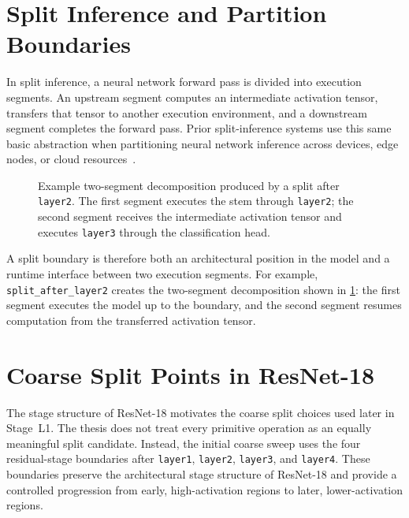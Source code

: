 \section{Split Inference and Partition Boundaries}
\label{sec:bg-split-inference}

In split inference, a neural network forward pass is divided into execution segments.
An upstream segment computes an intermediate activation tensor, transfers that tensor
to another execution environment, and a downstream segment completes the forward pass.
Prior split-inference systems use this same basic abstraction when partitioning neural
network inference across devices, edge nodes, or cloud resources~\cite{neurosurgeon,jointdnn}.

\begin{figure}[htbp]
\centering
%
\caption[Example two-segment decomposition (split after \texttt{layer2})]{Example two-segment decomposition produced by a split after \texttt{layer2}. The first segment executes the stem through \texttt{layer2}; the second segment receives the intermediate activation tensor and executes \texttt{layer3} through the classification head.}
\label{fig:split_after_layer2_two_segments}
\end{figure}

A split boundary is therefore both an architectural position in the model and a
runtime interface between two execution segments. For example,
\texttt{split\_after\_layer2} creates the two-segment decomposition shown in
\cref{fig:split_after_layer2_two_segments}: the first segment executes the model up
to the boundary, and the second segment resumes computation from the transferred
activation tensor.

\section{Coarse Split Points in ResNet-18}
\label{sec:bg-coarse-splits}

The stage structure of ResNet-18 motivates the coarse split choices used later in
Stage~L1. The thesis does not treat every primitive operation as an equally meaningful
split candidate. Instead, the initial coarse sweep uses the four residual-stage
boundaries after \texttt{layer1}, \texttt{layer2}, \texttt{layer3}, and
\texttt{layer4}. These boundaries preserve the architectural stage structure of
ResNet-18 and provide a controlled progression from early, high-activation regions
to later, lower-activation regions.

